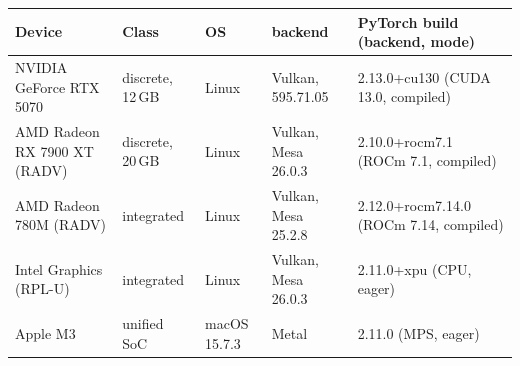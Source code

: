 \begin{tabular}{l l l l l}
\toprule
Device & Class & OS & \system{} backend & PyTorch build (backend, mode) \\
\midrule
NVIDIA GeForce RTX 5070 & discrete, 12\,GB & Linux & Vulkan, 595.71.05 & 2.13.0+cu130 (CUDA 13.0, compiled) \\
AMD Radeon RX 7900 XT (RADV) & discrete, 20\,GB & Linux & Vulkan, Mesa 26.0.3 & 2.10.0+rocm7.1 (ROCm 7.1, compiled) \\
AMD Radeon 780M (RADV) & integrated & Linux & Vulkan, Mesa 25.2.8 & 2.12.0+rocm7.14.0 (ROCm 7.14, compiled) \\
Intel Graphics (RPL-U) & integrated & Linux & Vulkan, Mesa 26.0.3 & 2.11.0+xpu (CPU, eager) \\
Apple M3 & unified SoC & macOS 15.7.3 & Metal & 2.11.0 (MPS, eager) \\
\bottomrule
\end{tabular}
